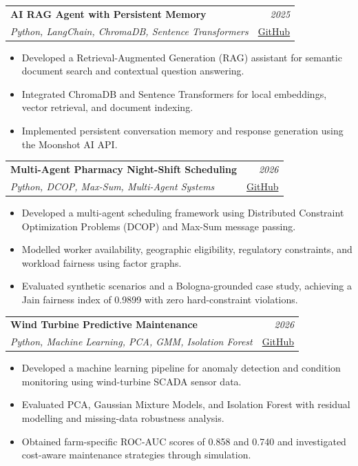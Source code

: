 \documentclass[a4paper,11pt]{article}
\makeatletter
\newcommand{\resumeSubheading}[4]{
\vspace{0.5mm}\item
    \begin{tabular*}{0.98\textwidth}[t]{l@{\extracolsep{\fill}}r}
        \textbf{#1} & \textit{\footnotesize{#4}} \\
        \textit{\footnotesize{#3}} &  \footnotesize{#2}\\
    \end{tabular*}
    \vspace{-1mm}
}
\newcommand{\resumeItemListStart}{\begin{itemize}[leftmargin=*,labelsep=1mm,itemsep=0.5mm]}
\newcommand{\resumeItemListEnd}{\end{itemize}\vspace{-1mm}}
\makeatother
\begin{document}
\resumeSubheading
  {AI RAG Agent with Persistent Memory}
  {\href{https://github.com/kawsarfarooq/RAG_AI_AGENT}{GitHub}}
  {Python, LangChain, ChromaDB, Sentence Transformers}
  {2025}
\resumeItemListStart
  \item Developed a Retrieval-Augmented Generation (RAG) assistant for semantic document search and contextual question answering.
  \item Integrated ChromaDB and Sentence Transformers for local embeddings, vector retrieval, and document indexing.
  \item Implemented persistent conversation memory and response generation using the Moonshot AI API.
\resumeItemListEnd

\resumeSubheading
  {Multi-Agent Pharmacy Night-Shift Scheduling}
  {\href{https://github.com/kawsarfarooq/Fair-pharmacy-night-shift-scheduling-as-a-DCOP}{GitHub}}
  {Python, DCOP, Max-Sum, Multi-Agent Systems}
  {2026}
\resumeItemListStart
  \item Developed a multi-agent scheduling framework using Distributed Constraint Optimization Problems (DCOP) and Max-Sum message passing.
  \item Modelled worker availability, geographic eligibility, regulatory constraints, and workload fairness using factor graphs.
  \item Evaluated synthetic scenarios and a Bologna-grounded case study, achieving a Jain fairness index of 0.9899 with zero hard-constraint violations.
\resumeItemListEnd

\resumeSubheading
  {Wind Turbine Predictive Maintenance}
  {\href{https://github.com/kawsarfarooq/Wind-Turbine-Predictive-Maintenance}{GitHub}}
  {Python, Machine Learning, PCA, GMM, Isolation Forest}
  {2026}
\resumeItemListStart
  \item Developed a machine learning pipeline for anomaly detection and condition monitoring using wind-turbine SCADA sensor data.
  \item Evaluated PCA, Gaussian Mixture Models, and Isolation Forest with residual modelling and missing-data robustness analysis.
  \item Obtained farm-specific ROC-AUC scores of 0.858 and 0.740 and investigated cost-aware maintenance strategies through simulation.
\resumeItemListEnd
\end{document}

